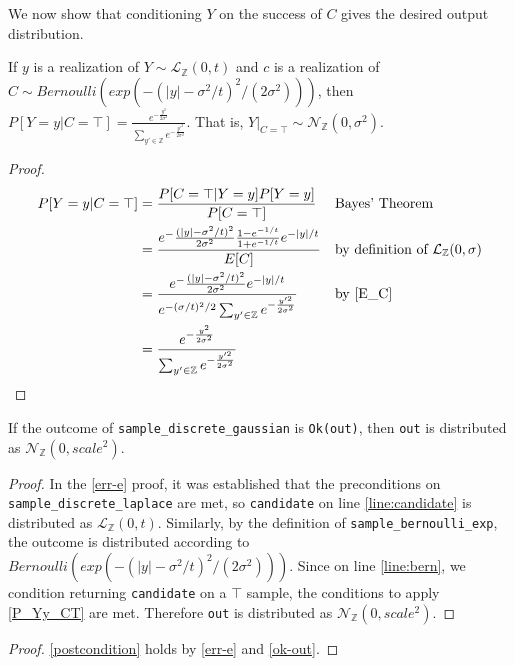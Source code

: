 \documentclass{article}
\begin{document}
We now show that conditioning $Y$ on the success of $C$ gives the desired output distribution.
\begin{theorem}\cite{CKS20}
    \label{P_Yy_CT} If $y$ is a realization of $Y \sim \mathcal{L}_\mathbb{Z}(0, t)$ and $c$ is a realization of $C \sim Bernoulli(exp(-(|y| - \sigma^2 / t)^2 / (2 \sigma^2)))$, then
    $P[Y=y | C=\top] = \frac{e^{-\frac{y^2}{2\sigma^2}}}{\sum_{y' \in \mathbb{Z}} e^{-\frac{y'^2}{2\sigma^2}}}$. That is, $Y|_{C=\top} \sim \mathcal{N}_\mathbb{Z}(0, \sigma^2)$.
\end{theorem}

\begin{proof}
    \begin{align*}
        P[Y=y | C=\top] &= \frac{P[C=\top|Y=y]P[Y=y]}{P[C=\top]} && \text{Bayes' Theorem} \\
        &= \frac{e^-\frac{(|y| - \sigma^2/t)^2}{2\sigma^2} \frac{1 - e^{-1/t}}{1 + e^{-1/t}} e^{-|y|/t}}{E[C]} && \text{by definition of } \mathcal{L}_\mathbb{Z}(0, \sigma) \\
        &= \frac{e^-\frac{(|y| - \sigma^2/t)^2}{2\sigma^2} e^{-|y|/t}}{e^{-(\sigma/t)^2/2} \sum_{y' \in \mathbb{Z}} e^{-\frac{y'^2}{2\sigma^2}}} && \text{by } \ref{E_C}\\
        &= \frac{e^{-\frac{y^2}{2\sigma^2}}}{\sum_{y' \in \mathbb{Z}} e^{-\frac{y'^2}{2\sigma^2}}}
    \end{align*}
\end{proof}

\begin{lemma}\label{ok-out}
    If the outcome of \texttt{sample\_discrete\_gaussian} is \texttt{Ok(out)},
    then \texttt{out} is distributed as $\mathcal{N}_\mathbb{Z}(0, scale^2)$.
\end{lemma}

\begin{proof}
    In the \ref{err-e} proof, it was established that the preconditions on \texttt{sample\_discrete\_laplace} are met,
    so \texttt{candidate} on line \ref{line:candidate} is distributed as $\mathcal{L}_\mathbb{Z}(0, t)$.
    Similarly, by the definition of \texttt{sample\_bernoulli\_exp}, the outcome is distributed according to $Bernoulli(exp(-(|y| - \sigma^2 / t)^2 / (2 \sigma^2)))$.
    Since on line \ref{line:bern}, we condition returning \texttt{candidate} on a $\top$ sample,
    the conditions to apply \ref{P_Yy_CT} are met.
    Therefore \texttt{out} is distributed as $\mathcal{N}_\mathbb{Z}(0, scale^2)$.
\end{proof}

\begin{proof}
    \ref{postcondition} holds by \ref{err-e} and \ref{ok-out}.
\end{proof}



\end{document}

